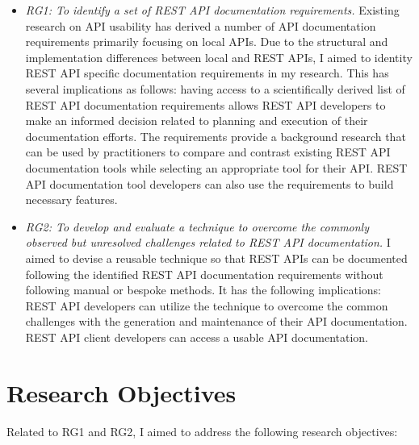 \begin{itemize}
  \item \textit{RG1: To identify a set of REST API documentation requirements.} Existing research on API usability has derived a number of API documentation requirements primarily focusing on local APIs. Due to the structural and implementation differences between local and REST APIs, I aimed to identity REST API specific documentation requirements in my research. This has several implications as follows: having access to a scientifically derived list of REST API documentation requirements allows REST API developers to make an informed decision related to planning and execution of their documentation efforts. The requirements provide a background research that can be used by practitioners to compare and contrast existing REST API documentation tools while selecting an appropriate tool for their API. REST API documentation tool developers can also use the requirements to build necessary features.
  \item \textit{RG2: To develop and evaluate a technique to overcome the commonly observed but unresolved challenges related to REST API documentation.} I aimed to devise a reusable technique so that REST APIs can be documented following the identified REST API documentation requirements without following manual or bespoke methods. It has the following implications: REST API developers can utilize the technique to overcome the common challenges with the generation and maintenance of their API documentation. REST API client developers can access a usable API documentation.
\end{itemize}


\section{Research Objectives}
Related to RG1 and RG2, I aimed to address the following research objectives:

